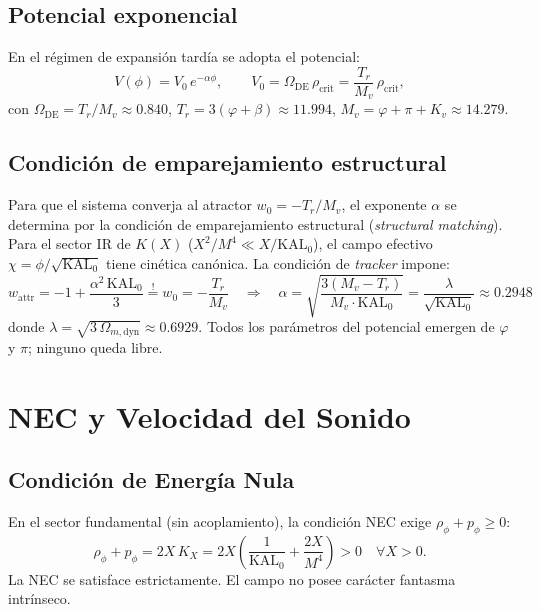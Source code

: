 \documentclass[11pt,a4paper]{article}
\newcommand{\phiG}{\varphi}          %
\newcommand{\KAL}{\mathrm{KAL}_0}   %
\newcommand{\Omde}{\Omega_{\mathrm{DE}}}
\newcommand{\rhocrit}{\rho_{\mathrm{crit}}}
\newcommand{\brac}[1]{\left(#1\right)}
\begin{document}
\subsection{Potencial exponencial}

En el régimen de expansión tardía se adopta el potencial:
%
\begin{equation}
  V(\phi) = V_0\,e^{-\alpha\phi},
  \qquad
  V_0 = \Omde\,\rhocrit = \frac{T_r}{M_v}\,\rhocrit,
  \label{eq:Vphi}
\end{equation}
%
con $\Omde = T_r/M_v \approx 0.840$, $T_r = 3(\phiG+\beta) \approx 11.994$,
$M_v = \phiG + \pi + K_v \approx 14.279$.

\subsection{Condición de emparejamiento estructural}

Para que el sistema converja al atractor $w_0 = -T_r/M_v$, el exponente
$\alpha$ se determina por la condición de emparejamiento estructural
(\textit{structural matching}).  Para el sector IR de $K(X)$
($X^2/M^4 \ll X/\KAL$), el campo efectivo $\chi = \phi/\sqrt{\KAL}$ tiene
cinética canónica.  La condición de \textit{tracker} impone:
%
\begin{equation}
  w_{\mathrm{attr}} = -1 + \frac{\alpha^2\,\KAL}{3}
  \stackrel{!}{=} w_0 = -\frac{T_r}{M_v}
  \quad\Longrightarrow\quad
  \boxed{\alpha = \sqrt{\frac{3(M_v - T_r)}{M_v\cdot\KAL}}
               = \frac{\lambda}{\sqrt{\KAL}} \approx 0.2948}
  \label{eq:alpha}
\end{equation}
%
donde $\lambda = \sqrt{3\,\Omega_{m,\mathrm{dyn}}} \approx 0.6929$.
Todos los parámetros del potencial emergen de $\phiG$ y $\pi$; ninguno
queda libre.

\section{NEC y Velocidad del Sonido}

\subsection{Condición de Energía Nula}

En el sector fundamental (sin acoplamiento), la condición NEC exige
$\rho_\phi + p_\phi \geq 0$:
%
\begin{equation}
  \rho_\phi + p_\phi = 2X\,K_X = 2X\!\brac{\frac{1}{\KAL} + \frac{2X}{M^4}} > 0
  \quad \forall X > 0.
  \label{eq:NEC}
\end{equation}
%
La NEC se satisface estrictamente.  El campo no posee carácter fantasma
intrínseco.
\end{document}
